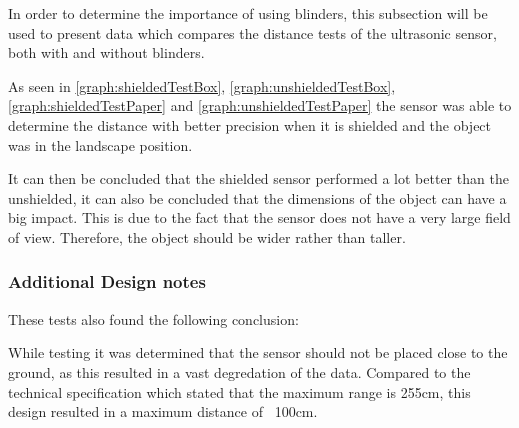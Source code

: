 In order to determine the importance of using blinders, this subsection will be
used to present data which compares the distance tests of the ultrasonic sensor,
both with and without blinders.






As seen in \autoref{graph:shieldedTestBox}, \autoref{graph:unshieldedTestBox},
\autoref{graph:shieldedTestPaper} and \autoref{graph:unshieldedTestPaper} the
sensor was able to determine the distance with better precision when it is
shielded and the object was in the landscape position. \nl

It can then be concluded that the shielded sensor performed a lot better than
the unshielded, it can also be concluded that the dimensions of the object can
have a big impact. This is due to the fact that the sensor does not have a very
large field of view. Therefore, the object should be wider rather than taller.

\subsubsection{Additional Design notes}
These tests also found the following conclusion:\nl

 While testing it was
determined that the sensor should not be placed close to the ground, as this resulted in a vast degredation of the data. Compared to the technical specification which stated that the maximum range is 255cm, this design resulted
in a maximum distance of ~100cm.\nl

